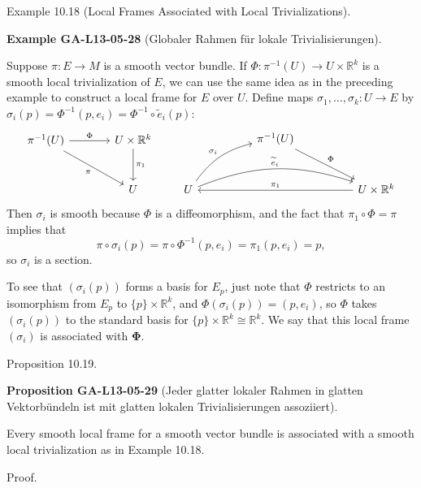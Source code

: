\documentclass[10pt, letterpaper]{article}
\newcommand{\CustomHeading}[3]{%
  \par\medskip\noindent%
  \textbf{#1 #2} \textnormal{(#3)}.\enskip%
}
\newenvironment{PROP}[2]{\begin{unitbox}\CustomHeading{Proposition}{#1}{#2}}{\end{unitbox}}
\newenvironment{EXA}[2]{\begin{unitbox}\CustomHeading{Example}{#1}{#2}}{\end{unitbox}}
\begin{document}
Example 10.18 (Local Frames Associated with Local Trivializations). 

\begin{EXA}{GA-L13-05-28}{Globaler Rahmen für lokale Trivialisierungen}
Suppose $\pi: E \rightarrow M$ is a smooth vector bundle. If $\Phi: \pi^{-1}(U) \rightarrow U \times \mathbb{R}^{k}$ is a smooth local trivialization of $E$, we can use the same idea as in the preceding example to construct a local frame for $E$ over $U$. Define maps $\sigma_{1}, \ldots, \sigma_{k}: U \rightarrow E$ by $\sigma_{i}(p)=\Phi^{-1}\left(p, e_{i}\right)=\Phi^{-1} \circ \tilde{e}_{i}(p):$
\[
\begin{tikzcd}[row sep=large, column sep=large]
\pi^{-1}(U) \arrow[r, "\Phi"] \arrow[dr, swap, "\pi"] & U \times \mathbb{R}^k \arrow[d, "\pi_1"] \\
& U
\end{tikzcd}
\qquad
\begin{tikzcd}[row sep=large, column sep=huge]
& \pi^{-1}(U) \arrow[dr, "\Phi"] & \\
U \arrow[ur, bend left=20, "\sigma_i"] \arrow[rr, "\widetilde{e}_i", bend left=20] & & U \times \mathbb{R}^k \arrow[ll, "\pi_1"']
\end{tikzcd}
\]
Then $\sigma_{i}$ is smooth because $\Phi$ is a diffeomorphism, and the fact that $\pi_{1} \circ \Phi=\pi$ implies that
$$
\pi \circ \sigma_{i}(p)=\pi \circ \Phi^{-1}\left(p, e_{i}\right)=\pi_{1}\left(p, e_{i}\right)=p,
$$
so $\sigma_{i}$ is a section. 

To see that $\left(\sigma_{i}(p)\right)$ forms a basis for $E_{p}$, just note that $\Phi$ restricts to an isomorphism from $E_{p}$ to $\{p\} \times \mathbb{R}^{k}$, and $\Phi\left(\sigma_{i}(p)\right)=\left(p, e_{i}\right)$, so $\Phi$ takes $\left(\sigma_{i}(p)\right)$ to the standard basis for $\{p\} \times \mathbb{R}^{k} \cong \mathbb{R}^{k}$. We say that this local frame $\left(\sigma_{i}\right)$ is associated with $\boldsymbol{\Phi}$.
\end{EXA}



Proposition 10.19. 

\begin{PROP}{GA-L13-05-29}{Jeder glatter lokaler Rahmen in glatten Vektorbündeln ist mit glatten lokalen Trivialisierungen assoziiert}
Every smooth local frame for a smooth vector bundle is associated with a smooth local trivialization as in Example 10.18.
\end{PROP}


Proof. 
\end{document}

